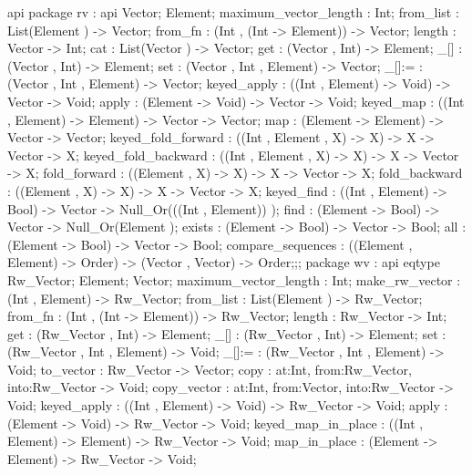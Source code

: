 api {   package rv
          : api {
                Vector;
                Element;
                maximum_vector_length : Int;
                from_list : List(Element ) -> Vector;
                from_fn : (Int , (Int -> Element)) -> Vector;
                length : Vector -> Int;
                cat : List(Vector ) -> Vector;
                get : (Vector , Int) -> Element;
                _[] : (Vector , Int) -> Element;
                set : (Vector , Int , Element) -> Vector;
                _[]:= : (Vector , Int , Element) -> Vector;
                keyed_apply : ((Int , Element) -> Void) -> Vector -> Void;
                apply : (Element -> Void) -> Vector -> Void;
                keyed_map : ((Int , Element) -> Element) -> Vector -> Vector;
                map : (Element -> Element) -> Vector -> Vector;
                keyed_fold_forward : ((Int , Element , X) -> X) -> X -> Vector -> X;
                keyed_fold_backward : ((Int , Element , X) -> X) -> X -> Vector -> X;
                fold_forward : ((Element , X) -> X) -> X -> Vector -> X;
                fold_backward : ((Element , X) -> X) -> X -> Vector -> X;
                keyed_find : ((Int , Element) -> Bool) -> Vector -> Null_Or(((Int , Element)) );
                find : (Element -> Bool) -> Vector -> Null_Or(Element );
                exists : (Element -> Bool) -> Vector -> Bool;
                all : (Element -> Bool) -> Vector -> Bool;
                compare_sequences : ((Element , Element) -> Order) -> (Vector , Vector) -> Order;};;
        package wv
          : api {
                eqtype Rw_Vector;
                Element;
                Vector;
                maximum_vector_length : Int;
                make_rw_vector : (Int , Element) -> Rw_Vector;
                from_list : List(Element ) -> Rw_Vector;
                from_fn : (Int , (Int -> Element)) -> Rw_Vector;
                length : Rw_Vector -> Int;
                get : (Rw_Vector , Int) -> Element;
                _[] : (Rw_Vector , Int) -> Element;
                set : (Rw_Vector , Int , Element) -> Void;
                _[]:= : (Rw_Vector , Int , Element) -> Void;
                to_vector : Rw_Vector -> Vector;
                copy : {at:Int, from:Rw_Vector, into:Rw_Vector} -> Void;
                copy_vector : {at:Int, from:Vector, into:Rw_Vector} -> Void;
                keyed_apply : ((Int , Element) -> Void) -> Rw_Vector -> Void;
                apply : (Element -> Void) -> Rw_Vector -> Void;
                keyed_map_in_place : ((Int , Element) -> Element) -> Rw_Vector -> Void;
                map_in_place : (Element -> Element) -> Rw_Vector -> Void;
}}
